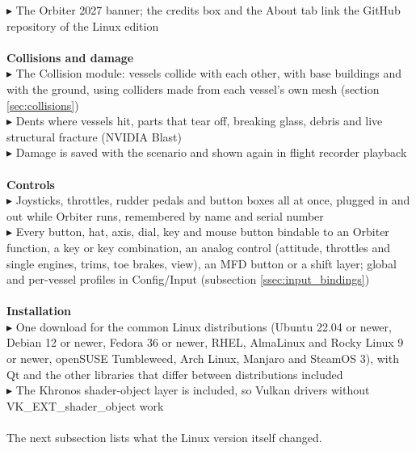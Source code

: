 \documentclass[Orbiter User Manual.tex]{subfiles}
\begin{document}
$\blacktriangleright$ The Orbiter 2027 banner; the credits box and the About tab link the GitHub repository of the Linux edition\\
\\
\textbf{Collisions and damage}\\
$\blacktriangleright$ The Collision module: vessels collide with each other, with base buildings and with the ground, using colliders made from each vessel's own mesh (section \ref{sec:collisions})\\
$\blacktriangleright$ Dents where vessels hit, parts that tear off, breaking glass, debris and live structural fracture (NVIDIA Blast)\\
$\blacktriangleright$ Damage is saved with the scenario and shown again in flight recorder playback\\
\\
\textbf{Controls}\\
$\blacktriangleright$ Joysticks, throttles, rudder pedals and button boxes all at once, plugged in and out while Orbiter runs, remembered by name and serial number\\
$\blacktriangleright$ Every button, hat, axis, dial, key and mouse button bindable to an Orbiter function, a key or key combination, an analog control (attitude, throttles and single engines, trims, toe brakes, view), an MFD button or a shift layer; global and per-vessel profiles in Config/Input (subsection \ref{ssec:input_bindings})\\
\\
\textbf{Installation}\\
$\blacktriangleright$ One download for the common Linux distributions (Ubuntu 22.04 or newer, Debian 12 or newer, Fedora 36 or newer, RHEL, AlmaLinux and Rocky Linux 9 or newer, openSUSE Tumbleweed, Arch Linux, Manjaro and SteamOS 3), with Qt and the other libraries that differ between distributions included\\
$\blacktriangleright$ The Khronos shader-object layer is included, so Vulkan drivers without VK\_EXT\_shader\_object work\\
\\
The next subsection lists what the Linux version itself changed.
\end{document}
